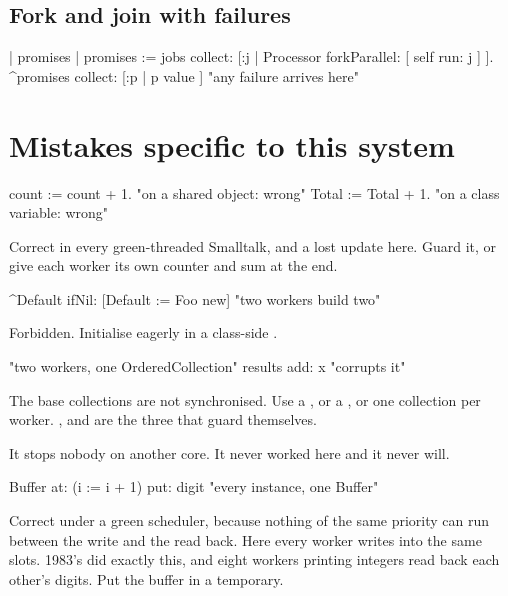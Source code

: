 \subsection{Fork and join with failures}

\begin{st}
| promises |
promises := jobs collect: [:j | Processor forkParallel: [ self run: j ] ].
^promises collect: [:p | p value ]     "any failure arrives here"
\end{st}

\section{Mistakes specific to this system}

\begin{stwarn}
\begin{st}
count := count + 1.        "on a shared object: wrong"
Total := Total + 1.        "on a class variable: wrong"
\end{st}
Correct in every green-threaded Smalltalk, and a lost update here. Guard it,
or give each worker its own counter and sum at the end.
\end{stwarn}

\begin{stwarn}
\begin{st}
^Default ifNil: [Default := Foo new]     "two workers build two"
\end{st}
Forbidden. Initialise eagerly in a class-side .
\end{stwarn}

\begin{stwarn}
\begin{st}
"two workers, one OrderedCollection"
results add: x                            "corrupts it"
\end{st}
The base collections are not synchronised. Use a , or a
, or one collection per worker. , 
and  are the three that guard themselves.
\end{stwarn}

\begin{stwarn}
It stops nobody on another core. It never worked here and it never will.
\end{stwarn}

\begin{stwarn}
\begin{st}
Buffer at: (i := i + 1) put: digit       "every instance, one Buffer"
\end{st}
Correct under a green scheduler, because nothing of the same priority can
run between the write and the read back. Here every worker writes into the
same slots. 1983's  did exactly this, and
eight workers printing integers read back each other's digits. Put the
buffer in a temporary.
\end{stwarn}

